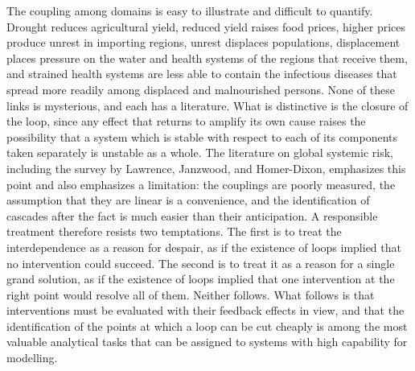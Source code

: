 The coupling among domains is easy to illustrate and difficult to quantify. Drought reduces agricultural yield, reduced yield raises food prices, higher prices produce unrest in importing regions, unrest displaces populations, displacement places pressure on the water and health systems of the regions that receive them, and strained health systems are less able to contain the infectious diseases that spread more readily among displaced and malnourished persons. None of these links is mysterious, and each has a literature. What is distinctive is the closure of the loop, since any effect that returns to amplify its own cause raises the possibility that a system which is stable with respect to each of its components taken separately is unstable as a whole. The literature on global systemic risk, including the survey by Lawrence, Janzwood, and Homer-Dixon, emphasizes this point and also emphasizes a limitation: the couplings are poorly measured, the assumption that they are linear is a convenience, and the identification of cascades after the fact is much easier than their anticipation. A responsible treatment therefore resists two temptations. The first is to treat the interdependence as a reason for despair, as if the existence of loops implied that no intervention could succeed. The second is to treat it as a reason for a single grand solution, as if the existence of loops implied that one intervention at the right point would resolve all of them. Neither follows. What follows is that interventions must be evaluated with their feedback effects in view, and that the identification of the points at which a loop can be cut cheaply is among the most valuable analytical tasks that can be assigned to systems with high capability for modelling.

